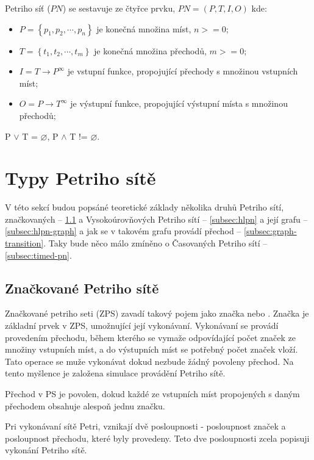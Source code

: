 Petriho síť ($PN$) se sestavuje ze čtyřce prvku, $PN = \left(P, T, I, O\right)$ kde:
  \begin{itemize}
    \item $P = \left\{p_1, p_2, \cdots , p_n\right\}$ je konečná množina míst, $n >= 0$; \\
    \item $T = \left\{t_1, t_2, \cdots , t_m\right\}$ je konečná množina přechodů, $m >= 0$; \\
    \item $I = T \rightarrow P^\infty$ je vstupní funkce, propojující přechody s množinou vstupních míst; \\
    \item $O = P \rightarrow T^\infty$ je výstupní funkce, propojující výstupní místa s množinou přechodů; \\
  \end{itemize}
P $\vee$ T = $\varnothing$, P $\wedge$ T != $\varnothing$.

\section{Typy Petriho sítě}

V této sekcí budou popsáné teoretické základy několika druhů Petriho sítí, značkovaných -- \ref{subsec:marked-pn} a Vysokoúrovňových Petriho sítí -- \ref{subsec:hlpn} a její grafu -- \ref{subsec:hlpn-graph} a jak se v takovém grafu provádí přechod -- \ref{subsec:graph-transition}. Taky bude něco málo zmíněno o Časovaných Petriho sítí -- \ref{subsec:timed-pn}.

\subsection{Značkované Petriho sítě}
\label{subsec:marked-pn}
Značkované petriho seti (ZPS) zavadí takový pojem jako značka nebo . Značka je základní prvek v ZPS, umožnující její vykonávaní. Vykonávaní se provádí provedením přechodu, během kterého se vymaže odpovídající počet značek ze množiny vstupních míst, a do výstupních míst se potřebný počet značek vloží. Tato operace se muže vykonávat dokud nezbude žádný povoleny přechod. Na tento myšlence je založena simulace provádění Petriho sítě.

Přechod v PS je povolen, dokud každé ze vstupních míst propojených s daným přechodem obsahuje alespoň jednu značku.

Pri vykonávaní sítě Petri, vznikají dvě posloupnosti - posloupnost značek a posloupnost přechodu, které byly provedeny. Teto dve posloupnosti zcela popisuji vykonání Petriho sítě.

